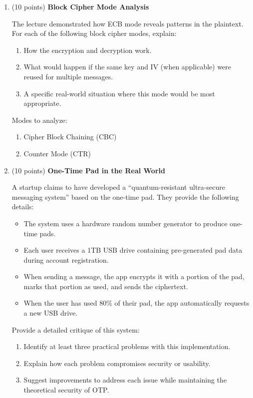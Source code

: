 \documentclass[10pt,a4paper,american]{article}
\begin{document}
\begin{enumerate}
	\item (10 points) \textbf{Block Cipher Mode Analysis}

	      The lecture demonstrated how ECB mode reveals patterns in the plaintext. For each of the following block cipher modes, explain:
	      \begin{enumerate}
		      \item How the encryption and decryption work.
		      \item What would happen if the same key and IV (when applicable) were reused for multiple messages.
		      \item A specific real-world situation where this mode would be most appropriate.
	      \end{enumerate}

	      Modes to analyze:
	      \begin{enumerate}
		      \item Cipher Block Chaining (CBC)
		      \item Counter Mode (CTR)
	      \end{enumerate}

	\item (10 points) \textbf{One-Time Pad in the Real World}

	      A startup claims to have developed a ``quantum-resistant ultra-secure messaging system'' based on the one-time pad. They provide the following details:

	      \begin{itemize}
		      \item The system uses a hardware random number generator to produce one-time pads.
		      \item Each user receives a 1TB USB drive containing pre-generated pad data during account registration.
		      \item When sending a message, the app encrypts it with a portion of the pad, marks that portion as used, and sends the ciphertext.
		      \item When the user has used 80\% of their pad, the app automatically requests a new USB drive.
	      \end{itemize}

	      Provide a detailed critique of this system:
	      \begin{enumerate}
		      \item Identify at least three practical problems with this implementation.
		      \item Explain how each problem compromises security or usability.
		      \item Suggest improvements to address each issue while maintaining the theoretical security of OTP.
	      \end{enumerate}


\end{enumerate}
\end{document}
